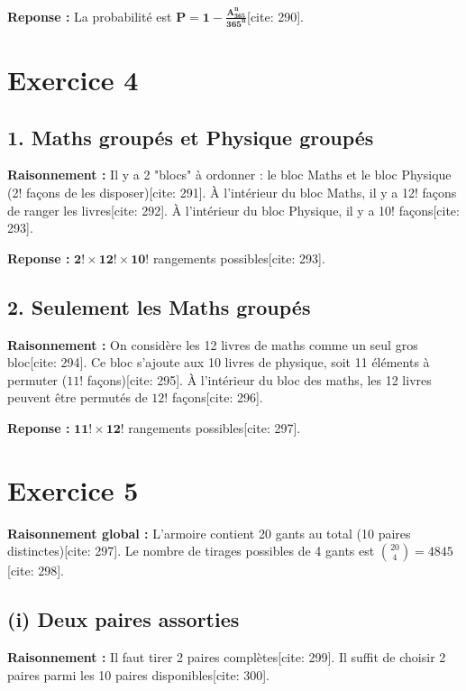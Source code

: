 \documentclass[11pt,a4paper]{article}
\begin{document}
\textbf{Reponse :} La probabilité est $\mathbf{P = 1 - \frac{A_{365}^n}{365^n}}$[cite: 290].

\hrulefill

\section*{Exercice 4}

\subsection*{1. Maths groupés et Physique groupés}

\textbf{Raisonnement :} Il y a 2 "blocs" à ordonner : le bloc Maths et le bloc Physique (2! façons de les disposer)[cite: 291]. À l'intérieur du bloc Maths, il y a 12! façons de ranger les livres[cite: 292]. À l'intérieur du bloc Physique, il y a 10! façons[cite: 293].

\textbf{Reponse :} $\mathbf{2! \times 12! \times 10!}$ rangements possibles[cite: 293].

\subsection*{2. Seulement les Maths groupés}

\textbf{Raisonnement :} On considère les 12 livres de maths comme un seul gros bloc[cite: 294]. Ce bloc s'ajoute aux 10 livres de physique, soit 11 éléments à permuter ($11!$ façons)[cite: 295]. À l'intérieur du bloc des maths, les 12 livres peuvent être permutés de $12!$ façons[cite: 296].

\textbf{Reponse :} $\mathbf{11! \times 12!}$ rangements possibles[cite: 297].

\hrulefill

\section*{Exercice 5}

\textbf{Raisonnement global :} L'armoire contient 20 gants au total (10 paires distinctes)[cite: 297]. Le nombre de tirages possibles de 4 gants est $\binom{20}{4} = 4845$[cite: 298].

\subsection*{(i) Deux paires assorties}

\textbf{Raisonnement :} Il faut tirer 2 paires complètes[cite: 299]. Il suffit de choisir 2 paires parmi les 10 paires disponibles[cite: 300].
\end{document}
